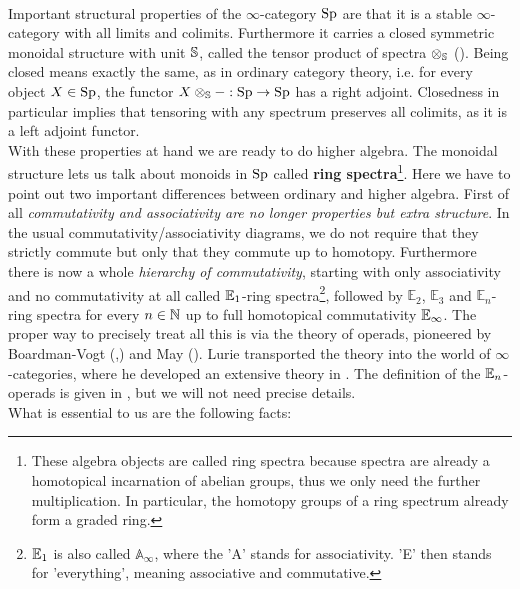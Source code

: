\\
Important structural properties of the $\infty$-category $\Sp$ are that it is a stable $\infty$-category with all limits and colimits. 
Furthermore it carries a closed symmetric monoidal structure with unit $\S$, called the tensor product of spectra $\otimes_\S$ (\cite[Corollary~4.8.2.19]{lurie2017higher}).
Being closed means exactly the same, as in ordinary category theory, i.e. for every object $X\in \Sp$, the functor $X\otimes_\S-:\Sp\to \Sp $ has a right adjoint. 
Closedness in particular implies that tensoring with any spectrum preserves all colimits, as it is a left adjoint functor. \\
With these properties at hand we are ready to do higher algebra.
The monoidal structure lets us talk about monoids in $\Sp$ called \textbf{ring spectra}\footnote{These algebra objects are called ring spectra because spectra are already a homotopical incarnation of abelian groups, thus we only need the further multiplication. In particular, the homotopy groups of a ring spectrum already form a graded ring.}.
Here we have to point out two important differences between ordinary and higher algebra. 
First of all \textit{commutativity and associativity are no longer  properties but extra structure}. In the usual commutativity/associativity diagrams, we do not require that they strictly commute but only that they commute up to homotopy. 
Furthermore there is now a whole \textit{hierarchy of commutativity}, starting with only associativity and no commutativity at all called $\Eone$-ring spectra\footnote{$\Eone$ is also called $\mathbb{A}_\infty$, where the 'A' stands for associativity. 'E' then stands for 'everything', meaning associative and commutative.}, followed by $\mathbb{E}_2$, $\mathbb{E}_3$ and $\mathbb{E}_n$-ring spectra for every $n\in \N$ up to full homotopical commutativity $\Einf$. 
The proper way to precisely treat all this is via the theory of operads, pioneered by Boardman-Vogt (\cite{BV2006homotopyalgstructures},\cite{BV1968homotopyHspaces}) and May (\cite{may2006geometryloop}).
Lurie transported the theory into the world of $\infty$-categories, where he developed an extensive theory in \cite[Chapter~2,3,4]{lurie2017higher}. The definition of the $\En$-operads is given in \cite[Definition~5.1.0.2]{lurie2017higher}, but we will not need precise details. \\
What is essential to us are the following facts:

